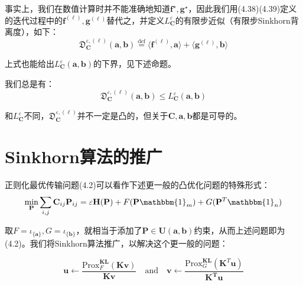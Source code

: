 \documentclass[cn,10pt,math=newtx,citestyle=gb7714-2015,bibstyle=gb7714-2015]{elegantbook}
\begin{document}
\newpage

事实上，我们在数值计算时并不能准确地知道$\mathbf{f}^\star,\mathbf{g}^\star$，因此我们用(4.38)(4.39)定义的迭代过程中的$\mathbf{f}^{(\ell)},\mathbf{g}^{(\ell)}$替代之，并定义$L_\mathbf{C}^\varepsilon$的有限步近似（有限步Sinkhorn背离度），如下：
\begin{equation}
    \label{4.43}
    \mathfrak{D}_\mathbf{C}^{\varepsilon,(\ell)}(\mathbf{a,b}) \overset{\text{def}}{=} \langle \mathbf{f}^{(\ell)}, \mathbf{a} \rangle + \langle \mathbf{g}^{(\ell)}, \mathbf{b} \rangle
\end{equation}

上式也能给出$L_\mathbf{C}^\varepsilon(\mathbf{a,b})$的下界，见下述命题。

\begin{proposition}[有限步Sinkhorn背离度对正则化问题解的下界估计]
    我们总是有：
    \begin{equation*}
        \mathfrak{D}_\mathbf{C}^{\varepsilon,(\ell)}(\mathbf{a,b}) \leq L_\mathbf{C}^\varepsilon(\mathbf{a,b})
    \end{equation*}
\end{proposition}

和$L_\mathbf{C}^\varepsilon$不同，$\mathfrak{D}_\mathbf{C}^{\varepsilon,(\ell)}$并不一定是凸的，但关于$\mathbf{C,a,b}$都是可导的。

\section{Sinkhorn算法的推广}

正则化最优传输问题(4.2)可以看作下述更一般的凸优化问题的特殊形式：
\begin{equation}
    \label{4.44}
    \min\limits_\mathbf{P} \sum_{i,j}\mathbf{C}_{ij}\mathbf{P}_{ij} = \varepsilon \mathbf{H}(\mathbf{P}) + F(\mathbf{P}\mathbbm{1}_m) + G(\mathbf{P}^T \mathbbm{1}_n)
\end{equation}

取$F=\iota_{\{\mathbf{a}\}},G=\iota_{\{\mathbf{b}\}}$，就相当于添加了$\mathbf{P}\in\mathbf{U(a,b)}$约束，从而上述问题即为(4.2)。我们将Sinkhorn算法推广，以解决这个更一般的问题：

\begin{equation}
    \label{4.45}
    \mathbf{u} \gets \frac{\text{Prox}_F^{\mathbf{KL}}(\mathbf{Kv})}{\mathbf{Kv}} \quad \text{and} \quad \mathbf{v} \gets \frac{\text{Prox}_G^{\mathbf{KL}}(\mathbf{K}^T\mathbf{u})}{\mathbf{\mathbf{K}^T\mathbf{u}}}
\end{equation}
\end{document}
